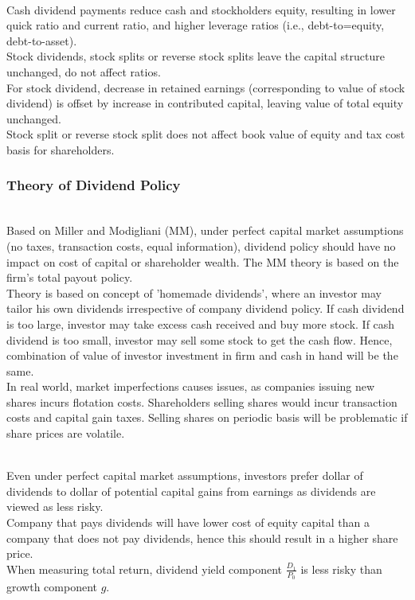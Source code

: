 \begin{remark} \\
Cash dividend payments reduce cash and stockholders equity, resulting in lower quick ratio and current ratio, and higher leverage ratios (i.e., debt-to=equity, debt-to-asset).\\
Stock dividends, stock splits or reverse stock splits leave the capital structure unchanged, do not affect ratios.\\
For stock dividend, decrease in retained earnings (corresponding to value of stock dividend) is offset by increase in contributed capital, leaving value of total equity unchanged.\\
Stock split or reverse stock split does not affect book value of equity and tax cost basis for shareholders.
\end{remark}

\subsubsection{Theory of Dividend Policy}

\begin{remark} \\
Based on Miller and Modigliani (MM), under perfect capital market assumptions (no taxes, transaction costs, equal information), dividend policy should have no impact on cost of capital or shareholder wealth. The MM theory is based on the firm's total payout policy.\\
Theory is based on concept of 'homemade dividends', where an investor may tailor his own dividends irrespective of company dividend policy. If cash dividend is too large, investor may take excess cash received and buy more stock. If cash dividend is too small, investor may sell some stock to get the cash flow. Hence, combination of value of investor investment in firm and cash in hand will be the same.\\
In real world, market imperfections causes issues, as companies issuing new shares incurs flotation costs. Shareholders selling shares would incur transaction costs and capital gain taxes.  Selling shares on periodic basis will be problematic if share prices are volatile.
\end{remark}

\begin{remark} \\
Even under perfect capital market assumptions, investors prefer dollar of dividends to dollar of potential capital gains from earnings as dividends are viewed as less risky.\\
Company that pays dividends will have lower cost of equity capital than a company that does not pay dividends, hence this should result in a higher share price.\\
When measuring total return, dividend yield component $\frac{D_1}{P_0}$ is less risky than growth component $g$.
\end{remark}

